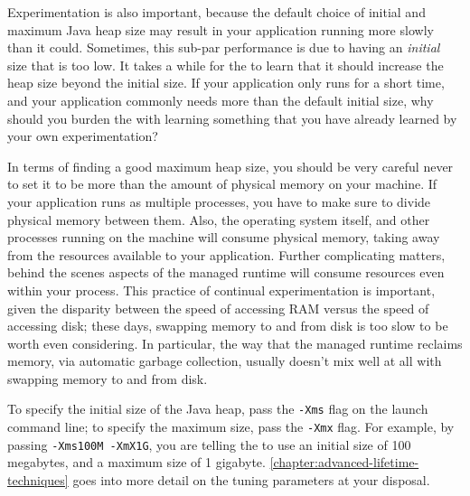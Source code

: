 Experimentation is also important, because the default choice of initial and
maximum Java heap size may result in your application running more slowly than
it could. Sometimes, this sub-par performance is due to having an
\emph{initial} size that is too low. It takes a while for the \jre to learn that
it should increase the heap size beyond the initial size. If your application
only runs for a short time, and your application commonly needs more than the
default initial size, why should you burden the \jre with learning something
that you have already learned by your own experimentation?

In terms of finding a good maximum heap size, you should be very careful never
to set it to be more than the amount of physical memory on your machine. If your
application runs as multiple processes, you have to make sure to divide physical
memory between them. Also, the operating system itself, and other processes
running on the machine will consume physical memory, taking away from the
resources available to your application. Further complicating matters, behind
the scenes aspects of the managed runtime will consume resources even within
your process. This practice of continual experimentation is important, given the
disparity between the speed of accessing RAM versus the speed of accessing disk;
these days, swapping memory to and from disk is too slow to be worth even
considering. In particular, the way that the managed runtime reclaims memory,
via automatic garbage collection, usually doesn't mix well at all with swapping
memory to and from disk.

To specify the initial size of the Java heap, pass the {\tt -Xms} flag on the
launch command line; to specify the maximum size, pass the {\tt -Xmx} flag. For
example, by passing {\tt -Xms100M -XmX1G}, you are telling the \jre to use an
initial size of 100 megabytes, and a maximum size of 1 gigabyte.
\autoref{chapter:advanced-lifetime-techniques} goes into more detail on the
tuning parameters at your disposal.




